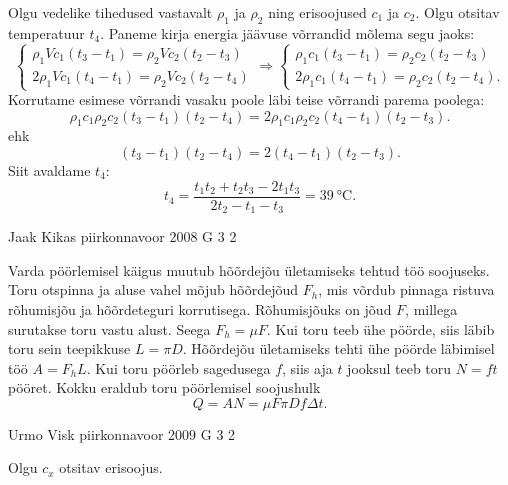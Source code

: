 \documentclass[11pt]{article}
\begin{document}
{{\ifSolution
Olgu vedelike tihedused vastavalt $\rho_1$ ja $\rho_2$ ning erisoojused $c_1$ ja $c_2$. Olgu otsitav temperatuur $t_4$. Paneme kirja energia jäävuse võrrandid mõlema segu jaoks:
\[
\left\{\begin{array}{l}
	{\rho_{1} V c_{1}\left(t_{3}-t_{1}\right)=\rho_{2} V c_{2}\left(t_{2}-t_{3}\right)} \\ {2 \rho_{1} V c_{1}\left(t_{4}-t_{1}\right)=\rho_{2} V c_{2}\left(t_{2}-t_{4}\right)}\end{array} \Rightarrow\left\{\begin{array}{l}{\rho_{1} c_{1}\left(t_{3}-t_{1}\right)=\rho_{2} c_{2}\left(t_{2}-t_{3}\right)} \\ {2 \rho_{1} c_{1}\left(t_{4}-t_{1}\right)=\rho_{2} c_{2}\left(t_{2}-t_{4}\right).}
\end{array}\right.\right.
\]
Korrutame esimese võrrandi vasaku poole läbi teise võrrandi parema poolega:
\[
\rho_{1} c_{1} \rho_{2} c_{2}\left(t_{3}-t_{1}\right)\left(t_{2}-t_{4}\right) =2 \rho_{1} c_{1} \rho_{2} c_{2}\left(t_{4}-t_{1}\right)\left(t_{2}-t_{3}\right).
\]
ehk
\[
\left(t_{3}-t_{1}\right)\left(t_{2}-t_{4}\right) =2\left(t_{4}-t_{1}\right)\left(t_{2}-t_{3}\right).
\]
Siit avaldame $t_4$:
\[
t_{4}=\frac{t_{1} t_{2}+t_{2} t_{3}-2 t_{1} t_{3}}{2 t_{2}-t_{1}-t_{3}}=\SI{39}{\celsius}.
\]
\fi
}

{Jaak Kikas} %
{piirkonnavoor} %
{2008} %
{G 3} %
{2} %
{

\ifSolution
Varda pöörlemisel käigus muutub hõõrdejõu ületamiseks tehtud töö soojuseks. Toru otspinna ja aluse vahel mõjub hõõrdejõud $F_h$, mis võrdub pinnaga ristuva rõhumisjõu ja hõõrdeteguri korrutisega. Rõhumisjõuks on jõud $F$, millega surutakse toru vastu alust. Seega $F_h = \mu F$. Kui toru teeb ühe pöörde, siis läbib toru sein teepikkuse $L = \pi D$. Hõõrdejõu ületamiseks tehti ühe pöörde läbimisel töö $A = F_hL$. Kui toru pöörleb sagedusega $f$, siis aja $t$ jooksul teeb toru $N = f t$ pööret. Kokku eraldub toru pöörlemisel soojushulk
\[
Q=A N=\mu F \pi D f \Delta t.
\]
\fi
}

{Urmo Visk} %
{piirkonnavoor} %
{2009} %
{G 3} %
{2} %
{

\ifSolution
Olgu $c_x$ otsitav erisoojus.

}}
\end{document}
